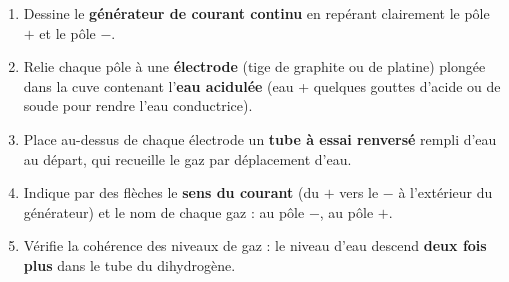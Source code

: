 \documentclass[11pt]{article}
\begin{document}
\begin{methode}
\begin{enumerate}
\item Dessine le \textbf{générateur de courant continu} en repérant clairement le pôle $+$ et le pôle $-$.
\item Relie chaque pôle à une \textbf{électrode} (tige de graphite ou de platine) plongée dans la cuve contenant l'\textbf{eau acidulée} (eau + quelques gouttes d'acide ou de soude pour rendre l'eau conductrice).
\item Place au-dessus de chaque électrode un \textbf{tube à essai renversé} rempli d'eau au départ, qui recueille le gaz par déplacement d'eau.
\item Indique par des flèches le \textbf{sens du courant} (du $+$ vers le $-$ à l'extérieur du générateur) et le nom de chaque gaz :  au pôle $-$,  au pôle $+$.
\item Vérifie la cohérence des niveaux de gaz : le niveau d'eau descend \textbf{deux fois plus} dans le tube du dihydrogène.
\end{enumerate}
\end{methode}
\end{document}
